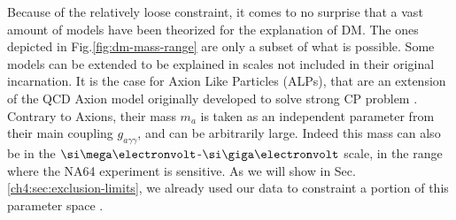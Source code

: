 Because of the relatively loose constraint, it comes to no surprise that a vast amount of models have been theorized for the explanation of DM. The ones depicted in Fig.\ref{fig:dm-mass-range} are only a subset of what is possible. Some models can be extended to be explained in scales not included in their original incarnation. It is the case for Axion Like Particles (ALPs), that are an extension of the QCD Axion model originally developed to solve strong CP problem \cite{PhysRevD.16.1791}. Contrary to Axions, their mass $m_a$ is taken as an independent parameter from their main coupling $g_{a \gamma \gamma}$, and can be arbitrarily large. Indeed this mass can also be in the $\mev$-$\gev$ scale, in the range where the NA64 experiment is sensitive. As we will show in Sec.\ref{ch4:sec:exclusion-limits}, we already used our data to constraint a portion of this parameter space \cite{Banerjee:2020fue}.

